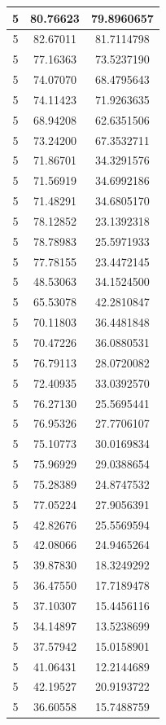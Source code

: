 \documentclass[
]{book}
\begin{document}
\begin{tabular}{c|c|c}
\hline
5 & 80.76623 & 79.8960657\\
\hline
5 & 82.67011 & 81.7114798\\
\hline
5 & 77.16363 & 73.5237190\\
\hline
5 & 74.07070 & 68.4795643\\
\hline
5 & 74.11423 & 71.9263635\\
\hline
5 & 68.94208 & 62.6351506\\
\hline
5 & 73.24200 & 67.3532711\\
\hline
5 & 71.86701 & 34.3291576\\
\hline
5 & 71.56919 & 34.6992186\\
\hline
5 & 71.48291 & 34.6805170\\
\hline
5 & 78.12852 & 23.1392318\\
\hline
5 & 78.78983 & 25.5971933\\
\hline
5 & 77.78155 & 23.4472145\\
\hline
5 & 48.53063 & 34.1524500\\
\hline
5 & 65.53078 & 42.2810847\\
\hline
5 & 70.11803 & 36.4481848\\
\hline
5 & 70.47226 & 36.0880531\\
\hline
5 & 76.79113 & 28.0720082\\
\hline
5 & 72.40935 & 33.0392570\\
\hline
5 & 76.27130 & 25.5695441\\
\hline
5 & 76.95326 & 27.7706107\\
\hline
5 & 75.10773 & 30.0169834\\
\hline
5 & 75.96929 & 29.0388654\\
\hline
5 & 75.28389 & 24.8747532\\
\hline
5 & 77.05224 & 27.9056391\\
\hline
5 & 42.82676 & 25.5569594\\
\hline
5 & 42.08066 & 24.9465264\\
\hline
5 & 39.87830 & 18.3249292\\
\hline
5 & 36.47550 & 17.7189478\\
\hline
5 & 37.10307 & 15.4456116\\
\hline
5 & 34.14897 & 13.5238699\\
\hline
5 & 37.57942 & 15.0158901\\
\hline
5 & 41.06431 & 12.2144689\\
\hline
5 & 42.19527 & 20.9193722\\
\hline
5 & 36.60558 & 15.7488759\\

\end{tabular}
\end{document}
